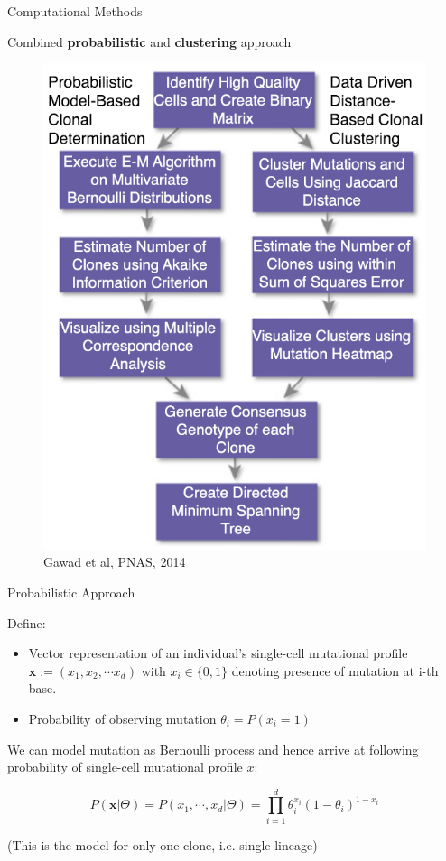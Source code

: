 \documentclass[pdf, aspectratio=169]{beamer}
\begin{document}
\begin{frame}{Computational Methods}

	Combined \textbf{probabilistic} and \textbf{clustering} approach

	\begin{figure}
		\center
		\includegraphics[scale=.3]{04.png}
		{\tiny Gawad et al, PNAS, 2014}
	\end{figure}
\end{frame}

\begin{frame}{Probabilistic Approach}
	
	Define:
	\begin{itemize}
		\item Vector representation of an individual's single-cell mutational profile $\mathbf{x} := (x_1, x_2, \cdots x_d)$ with $x_i \in \{0, 1\}$ denoting presence of mutation at i-th base.
		\item Probability of observing mutation $\theta_i = P(x_i = 1)$
	\end{itemize}
	
	We can model mutation as Bernoulli process and hence arrive at following probability of single-cell mutational profile $x$:
	
	
	$$P(\mathbf{x}|\Theta) = P(x_1, \cdots, x_d|\Theta) = \prod_{i=1}^{d} \theta_i^{x_i}(1 - \theta_i)^{1 - x_i}$$
	
	(This is the model for only one clone, i.e. single lineage)
	
\end{frame}
\end{document}

